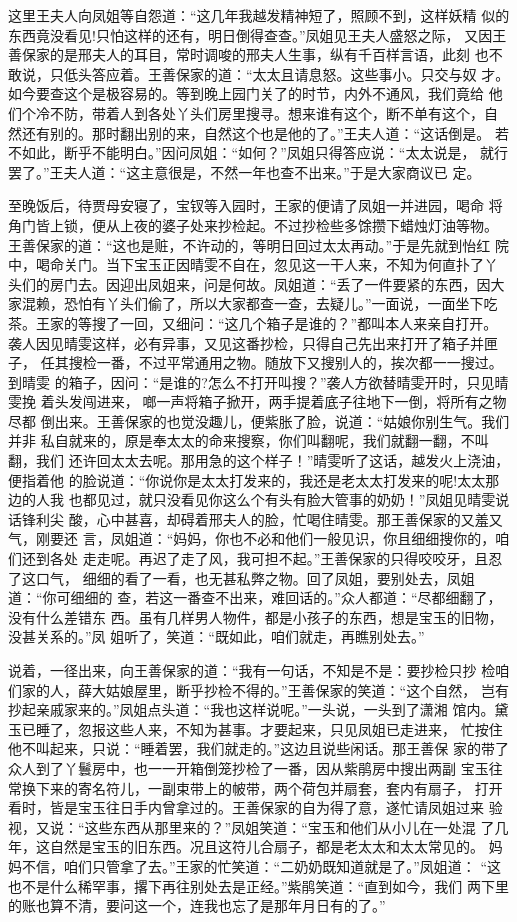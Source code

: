 这里王夫人向凤姐等自怨道：“这几年我越发精神短了，照顾不到，这样妖精
似的东西竟没看见!只怕这样的还有，明日倒得查查。”凤姐见王夫人盛怒之际，
又因王善保家的是邢夫人的耳目，常时调唆的邢夫人生事，纵有千百样言语，此刻
也不敢说，只低头答应着。王善保家的道：“太太且请息怒。这些事小。只交与奴
才。如今要查这个是极容易的。等到晚上园门关了的时节，内外不通风，我们竟给
他们个冷不防，带着人到各处丫头们房里搜寻。想来谁有这个，断不单有这个，自
然还有别的。那时翻出别的来，自然这个也是他的了。”王夫人道：“这话倒是。
若不如此，断乎不能明白。”因问凤姐：“如何？”凤姐只得答应说：“太太说是，
就行罢了。”王夫人道：“这主意很是，不然一年也查不出来。”于是大家商议已
定。

至晚饭后，待贾母安寝了，宝钗等入园时，王家的便请了凤姐一并进园，喝命
将角门皆上锁，便从上夜的婆子处来抄检起。不过抄检些多馀攒下蜡烛灯油等物。
王善保家的道：“这也是赃，不许动的，等明日回过太太再动。”于是先就到怡红
院中，喝命关门。当下宝玉正因晴雯不自在，忽见这一干人来，不知为何直扑了丫
头们的房门去。因迎出凤姐来，问是何故。凤姐道：“丢了一件要紧的东西，因大
家混赖，恐怕有丫头们偷了，所以大家都查一查，去疑儿。”一面说，一面坐下吃
茶。王家的等搜了一回，又细问：“这几个箱子是谁的？”都叫本人来亲自打开。
袭人因见晴雯这样，必有异事，又见这番抄检，只得自己先出来打开了箱子并匣子，
任其搜检一番，不过平常通用之物。随放下又搜别人的，挨次都一一搜过。到晴雯
的箱子，因问：“是谁的?怎么不打开叫搜？”袭人方欲替晴雯开时，只见晴雯挽
着头发闯进来，啷一声将箱子掀开，两手提着底子往地下一倒，将所有之物尽都
倒出来。王善保家的也觉没趣儿，便紫胀了脸，说道：“姑娘你别生气。我们并非
私自就来的，原是奉太太的命来搜察，你们叫翻呢，我们就翻一翻，不叫翻，我们
还许回太太去呢。那用急的这个样子！”晴雯听了这话，越发火上浇油，便指着他
的脸说道：“你说你是太太打发来的，我还是老太太打发来的呢!太太那边的人我
也都见过，就只没看见你这么个有头有脸大管事的奶奶！”凤姐见晴雯说话锋利尖
酸，心中甚喜，却碍着邢夫人的脸，忙喝住晴雯。那王善保家的又羞又气，刚要还
言，凤姐道：“妈妈，你也不必和他们一般见识，你且细细搜你的，咱们还到各处
走走呢。再迟了走了风，我可担不起。”王善保家的只得咬咬牙，且忍了这口气，
细细的看了一看，也无甚私弊之物。回了凤姐，要别处去，凤姐道：“你可细细的
查，若这一番查不出来，难回话的。”众人都道：“尽都细翻了，没有什么差错东
西。虽有几样男人物件，都是小孩子的东西，想是宝玉的旧物，没甚关系的。”凤
姐听了，笑道：“既如此，咱们就走，再瞧别处去。”

说着，一径出来，向王善保家的道：“我有一句话，不知是不是：要抄检只抄
检咱们家的人，薛大姑娘屋里，断乎抄检不得的。”王善保家的笑道：“这个自然，
岂有抄起亲戚家来的。”凤姐点头道：“我也这样说呢。”一头说，一头到了潇湘
馆内。黛玉已睡了，忽报这些人来，不知为甚事。才要起来，只见凤姐已走进来，
忙按住他不叫起来，只说：“睡着罢，我们就走的。”这边且说些闲话。那王善保
家的带了众人到了丫鬟房中，也一一开箱倒笼抄检了一番，因从紫鹃房中搜出两副
宝玉往常换下来的寄名符儿，一副束带上的帔带，两个荷包并扇套，套内有扇子，
打开看时，皆是宝玉往日手内曾拿过的。王善保家的自为得了意，遂忙请凤姐过来
验视，又说：“这些东西从那里来的？”凤姐笑道：“宝玉和他们从小儿在一处混
了几年，这自然是宝玉的旧东西。况且这符儿合扇子，都是老太太和太太常见的。
妈妈不信，咱们只管拿了去。”王家的忙笑道：“二奶奶既知道就是了。”凤姐道：
“这也不是什么稀罕事，撂下再往别处去是正经。”紫鹃笑道：“直到如今，我们
两下里的账也算不清，要问这一个，连我也忘了是那年月日有的了。”

